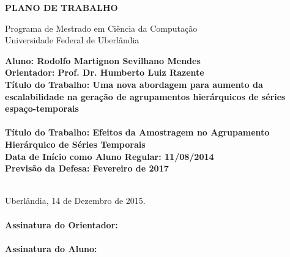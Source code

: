 \documentclass[12pt]{article}
\begin{document}
\begin{center}
    \bf{
        \LARGE{PLANO DE TRABALHO}
        \\ $\ $\\
    }
    
    \Large{
        Programa de Mestrado em Ciência da Computação\\
        Universidade Federal de Uberlândia
    }
    \\ $\ $\\
\end{center}

\begin{center}
    \bf{
        Aluno: Rodolfo Martignon Sevilhano Mendes\\ $\ $\\
        Orientador: Prof. Dr. Humberto Luiz Razente\\ $\ $\\
        Título do Trabalho: Uma nova abordagem para aumento da escalabilidade na
				geração de agrupamentos hierárquicos de séries espaço-temporais\\ \ \ \\
        Título do Trabalho: Efeitos da Amostragem no Agrupamento \\
				Hierárquico de Séries Temporais\\ $\ $\\
        Data de Início como Aluno Regular: 11/08/2014\\ $\ $\\
        Previsão da Defesa: Fevereiro de 2017\\ $\ $\\
    }
\end{center}








\ \\
\noindent Uberlândia, 14 de Dezembro de 2015.\\

\ \\
\noindent \textbf{Assinatura do Orientador:} \\

\ \\
\noindent \textbf{Assinatura do Aluno:}


\end{document}
